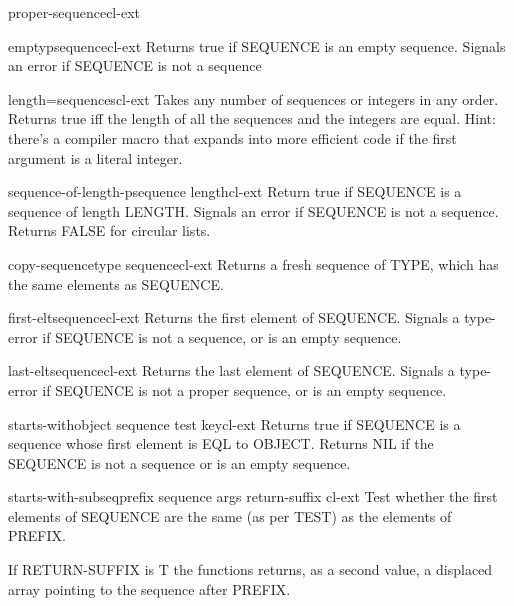 \begin{type}{proper-sequence}{}{cl-ext}{}
  
\end{type}

\begin{function}{emptyp}{sequence}{cl-ext}{}
  Returns true if SEQUENCE is an empty sequence. Signals an error if SEQUENCE
is not a sequence
\end{function}

\begin{function}{length=}{\rest sequences}{cl-ext}{}
  Takes any number of sequences or integers in any order. Returns true iff
the length of all the sequences and the integers are equal. Hint: there's a
compiler macro that expands into more efficient code if the first argument
is a literal integer.
\end{function}

\begin{function}{sequence-of-length-p}{sequence length}{cl-ext}{}
  Return true if SEQUENCE is a sequence of length LENGTH. Signals an error if
SEQUENCE is not a sequence. Returns FALSE for circular lists.
\end{function}

\begin{function}{copy-sequence}{type sequence}{cl-ext}{}
  Returns a fresh sequence of TYPE, which has the same elements as
SEQUENCE.
\end{function}

\begin{function}{first-elt}{sequence}{cl-ext}{}
  Returns the first element of SEQUENCE. Signals a type-error if SEQUENCE is
not a sequence, or is an empty sequence.
\end{function}

\begin{function}{last-elt}{sequence}{cl-ext}{}
  Returns the last element of SEQUENCE. Signals a type-error if SEQUENCE is
not a proper sequence, or is an empty sequence.
\end{function}

\begin{function}{starts-with}{object sequence \key test key}{cl-ext}{}
  Returns true if SEQUENCE is a sequence whose first element is EQL to OBJECT.
Returns NIL if the SEQUENCE is not a sequence or is an empty sequence.
\end{function}

\begin{function}{starts-with-subseq}{prefix sequence \rest args \key return-suffix \akeys}{cl-ext}{}
  Test whether the first elements of SEQUENCE are the same (as per TEST) as the elements of PREFIX.

If RETURN-SUFFIX is T the functions returns, as a second value, a
displaced array pointing to the sequence after PREFIX.
\end{function}

